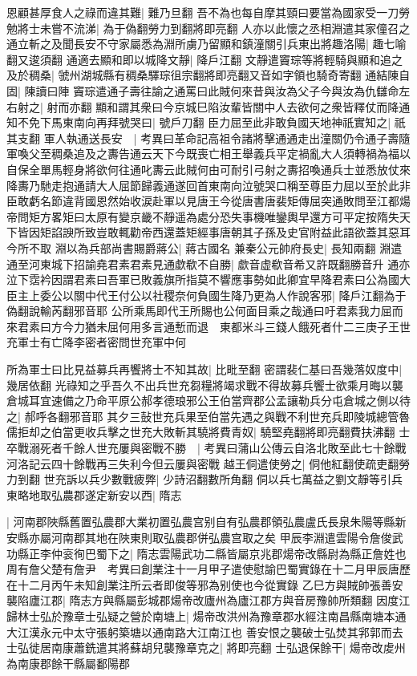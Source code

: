 恩顧甚厚食人之祿而違其難|{
	難乃旦翻}
吾不為也每自摩其頸曰要當為國家受一刀勞勉將士未嘗不流涕|{
	為于偽翻勞力到翻將即亮翻}
人亦以此懷之丞相淵遣其家僮召之通立斬之及聞長安不守家屬悉為淵所虜乃留顯和鎮潼關引兵東出將趣洛陽|{
	趣七喻翻又逡須翻}
通適去顯和即以城降文靜|{
	降戶江翻}
文靜遣竇琮等將輕騎與顯和追之及於稠桑|{
	虢州湖城縣有稠桑驛琮徂宗翻將即亮翻又音如字領也騎奇寄翻}
通結陳自固|{
	陳讀曰陣}
竇琮遣通子壽往諭之通罵曰此賊何來昔與汝為父子今與汝為仇讎命左右射之|{
	射而亦翻}
顯和謂其衆曰今京城巳陷汝輩皆關中人去欲何之衆皆釋仗而降通知不免下馬東南向再拜號哭曰|{
	號戶刀翻}
臣力屈至此非敢負國天地神祇實知之|{
	祇其支翻}
軍人執通送長安　|{
	考異曰革命記高祖令諸將擊通通走出潼關仍令通子壽隨軍喚父至稠桑追及之夀告通云天下今既喪亡相王舉義兵平定禍亂大人須轉禍為福以自保全單馬輕身將欲何往通叱夀云此賊何由可耐引弓射之夀招喚通兵士並悉放仗來降夀乃馳走抱通請大人屈節歸義通遂回首東南向泣號哭口稱至尊臣力屈以至於此非臣敢虧名節違背國恩然始收涙赴軍以見唐王今從唐書唐裴矩傳屈突通敗問至江都煬帝問矩方畧矩曰太原有變京畿不靜遥為處分恐失事機唯鑾輿早還方可平定按隋失天下皆因矩諂諛所致豈敢輒勸帝西還蓋矩經事唐朝其子孫及史官附益此語欲蓋其惡耳今所不取}
淵以為兵部尚書賜爵蔣公|{
	蔣古國名}
兼秦公元帥府長史|{
	長知兩翻}
淵遣通至河東城下招諭堯君素君素見通歔欷不自勝|{
	歔音虚欷音希又許既翻勝音升}
通亦泣下霑衿因謂君素曰吾軍已敗義旗所指莫不響應事勢如此卿宜早降君素曰公為國大臣主上委公以關中代王付公以社稷奈何負國生降乃更為人作說客邪|{
	降戶江翻為于偽翻說輸芮翻邪音耶}
公所乘馬即代王所賜也公何面目乘之哉通曰吁君素我力屈而來君素曰方今力猶未屈何用多言通慙而退　東都米斗三錢人餓死者什二三庚子王世充軍士有亡降李密者密問世充軍中何

所為軍士曰比見益募兵再饗將士不知其故|{
	比毗至翻}
密謂裴仁基曰吾幾落奴度中|{
	幾居依翻}
光祿知之乎吾久不出兵世充芻糧將竭求戰不得故募兵饗士欲乘月晦以襲倉城耳宜速備之乃命平原公郝孝德琅邪公王伯當齊郡公孟讓勒兵分屯倉城之側以待之|{
	郝呼各翻邪音耶}
其夕三鼔世充兵果至伯當先遇之與戰不利世充兵即陵城總管魯儒拒却之伯當更收兵擊之世充大敗斬其驍將費青奴|{
	驍堅堯翻將即亮翻費扶沸翻}
士卒戰溺死者千餘人世充屢與密戰不勝　|{
	考異曰蒲山公傳云自洛北敗至此七十餘戰河洛記云四十餘戰再三失利今但云屢與密戰}
越王侗遣使勞之|{
	侗他紅翻使疏吏翻勞力到翻}
世充訴以兵少數戰疲弊|{
	少詩沼翻數所角翻}
侗以兵七萬益之劉文靜等引兵東略地取弘農郡遂定新安以西|{
	隋志}


|{
	河南郡陜縣舊置弘農郡大業初置弘農宫别自有弘農郡領弘農盧氏長泉朱陽等縣新安縣亦屬河南郡其地在陜東則取弘農郡併弘農宫取之矣}
甲辰李淵遣雲陽令詹俊武功縣正李仲衮徇巴蜀下之|{
	隋志雲陽武功二縣皆屬京兆郡煬帝改縣尉為縣正詹姓也周有詹父楚有詹尹　考異曰創業注十一月甲子遣使慰諭巴蜀實錄在十二月甲辰唐歷在十二月丙午未知創業注所云者即俊等邪為别使也今從實錄}
乙巳方與賊帥張善安襲陷廬江郡|{
	隋志方與縣屬彭城郡煬帝改廬州為廬江郡方與音房豫帥所類翻}
因度江歸林士弘於豫章士弘疑之營於南塘上|{
	煬帝改洪州為豫章郡水經注南昌縣南塘本通大江漢永元中太守張躬築塘以通南路大江南江也}
善安恨之襲破士弘焚其郛郭而去士弘徙居南康蕭銑遣其將蘇胡兒襲豫章克之|{
	將即亮翻}
士弘退保餘干|{
	煬帝改䖍州為南康郡餘干縣屬鄱陽郡}


